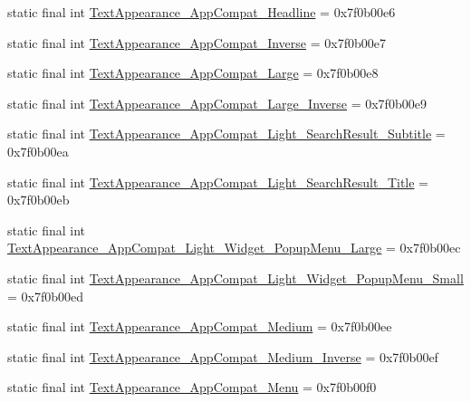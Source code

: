 \begin{CompactItemize}
\item 
static final int \hyperlink{classandroid_1_1support_1_1graphics_1_1drawable_1_1_r_1_1style_7a90cd99603838b526a80a0b2afdd84c}{TextAppearance\_\-AppCompat\_\-Headline} = 0x7f0b00e6
\item 
static final int \hyperlink{classandroid_1_1support_1_1graphics_1_1drawable_1_1_r_1_1style_066e4d8e4f3198c254fa08490cc4a1d6}{TextAppearance\_\-AppCompat\_\-Inverse} = 0x7f0b00e7
\item 
static final int \hyperlink{classandroid_1_1support_1_1graphics_1_1drawable_1_1_r_1_1style_2be68013a937f2c1dfb44cd643898cb6}{TextAppearance\_\-AppCompat\_\-Large} = 0x7f0b00e8
\item 
static final int \hyperlink{classandroid_1_1support_1_1graphics_1_1drawable_1_1_r_1_1style_b7458f6397dab4cf8d4dd199e95b7613}{TextAppearance\_\-AppCompat\_\-Large\_\-Inverse} = 0x7f0b00e9
\item 
static final int \hyperlink{classandroid_1_1support_1_1graphics_1_1drawable_1_1_r_1_1style_9e2d99477dbc3506f474c72605f801db}{TextAppearance\_\-AppCompat\_\-Light\_\-SearchResult\_\-Subtitle} = 0x7f0b00ea
\item 
static final int \hyperlink{classandroid_1_1support_1_1graphics_1_1drawable_1_1_r_1_1style_c189587b81bb04f4c3080c17394b264e}{TextAppearance\_\-AppCompat\_\-Light\_\-SearchResult\_\-Title} = 0x7f0b00eb
\item 
static final int \hyperlink{classandroid_1_1support_1_1graphics_1_1drawable_1_1_r_1_1style_95abee7fd4d0e4045da0cf50da7e69be}{TextAppearance\_\-AppCompat\_\-Light\_\-Widget\_\-PopupMenu\_\-Large} = 0x7f0b00ec
\item 
static final int \hyperlink{classandroid_1_1support_1_1graphics_1_1drawable_1_1_r_1_1style_44b70e7be1ff6a32f6b615ebfff44635}{TextAppearance\_\-AppCompat\_\-Light\_\-Widget\_\-PopupMenu\_\-Small} = 0x7f0b00ed
\item 
static final int \hyperlink{classandroid_1_1support_1_1graphics_1_1drawable_1_1_r_1_1style_b306b8c964cee04a02d39eee9cd08d1d}{TextAppearance\_\-AppCompat\_\-Medium} = 0x7f0b00ee
\item 
static final int \hyperlink{classandroid_1_1support_1_1graphics_1_1drawable_1_1_r_1_1style_b87661e193b11e7d542dda7a475f2ffb}{TextAppearance\_\-AppCompat\_\-Medium\_\-Inverse} = 0x7f0b00ef
\item 
static final int \hyperlink{classandroid_1_1support_1_1graphics_1_1drawable_1_1_r_1_1style_bc9ad795934342a1d274e165d16ee146}{TextAppearance\_\-AppCompat\_\-Menu} = 0x7f0b00f0
\item 

\end{CompactItemize}
